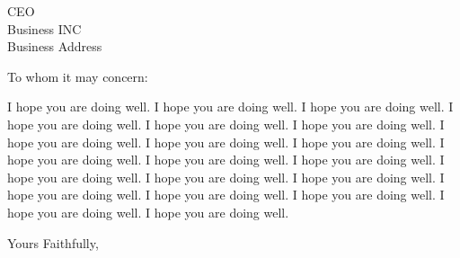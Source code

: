 \documentclass{letter}
\begin{document}
	
	\begin{letter}{CEO \\ Business INC \\ Business Address}
		
		\opening{To whom it may concern:}
		
		I hope you are doing well. I hope you are doing well.
		I hope you are doing well. I hope you are doing well.
		I hope you are doing well. I hope you are doing well.
		I hope you are doing well. I hope you are doing well.
		I hope you are doing well. I hope you are doing well.
		I hope you are doing well. I hope you are doing well.
		I hope you are doing well. I hope you are doing well.
		I hope you are doing well. I hope you are doing well.
		I hope you are doing well. I hope you are doing well.
		I hope you are doing well. I hope you are doing well.
		
		\closing{Yours Faithfully, }
		
	\end{letter}
	
\end{document}
